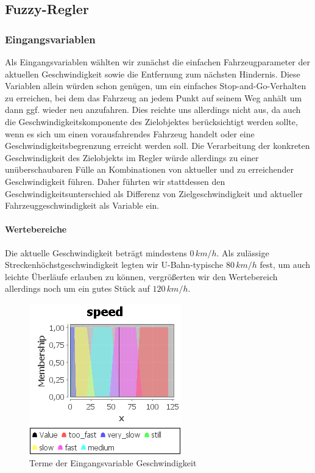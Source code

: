 \documentclass[10pt,a4paper]{article}
\begin{document}
\subsection{Fuzzy-Regler}

\subsubsection{Eingangsvariablen}
Als Eingangsvariablen wählten wir zunächst die einfachen Fahrzeugparameter der aktuellen Geschwindigkeit sowie die Entfernung zum nächsten Hindernis. Diese Variablen allein würden schon genügen, um ein einfaches Stop-and-Go-Verhalten zu erreichen, bei dem das Fahrzeug an jedem Punkt auf seinem Weg anhält um dann ggf. wieder neu anzufahren.
\newline
Dies reichte uns allerdings nicht aus, da auch die Geschwindigkeitskomponente des Zielobjektes berücksichtigt werden sollte, wenn es sich um einen vorausfahrendes Fahrzeug handelt oder eine Geschwindigkeitsbegrenzung erreicht werden soll.
Die Verarbeitung der konkreten Geschwindigkeit des Zielobjekts im Regler würde allerdings zu einer unüberschaubaren Fülle an Kombinationen von aktueller und zu erreichender Geschwindigkeit führen. Daher führten wir stattdessen den Geschwindigkeitsunterschied als Differenz von Zielgeschwindigkeit und aktueller Fahrzeuggeschwindigkeit als Variable ein.
\paragraph{Wertebereiche}
Die aktuelle Geschwindigkeit beträgt mindestens $ 0\, km/h $. Als zulässige Streckenhöchstgeschwindigkeit legten wir U-Bahn-typische $ 80\, km/h $ fest, um auch leichte Überläufe erlauben zu können, vergrößerten wir den Wertebereich allerdings noch um ein gutes Stück auf $ 120\, km/h $.

\begin{figure}[htb]
\begin{center}
\includegraphics[width=.5\textwidth]{var_speed.png}
\caption[Eingangsvariable Geschwindigkeit]{Terme der Eingangsvariable Geschwindigkeit}
\label{var_speed}
\end{center}
\end{figure}
\end{document}
